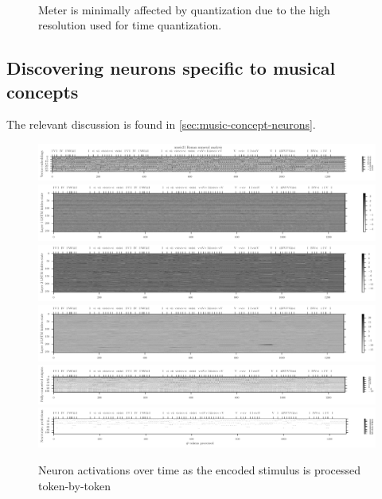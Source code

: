 \begin{figure}[htbp]
    \centering
    \begin{subfigure}[t]{0.48\textwidth}
        \centering
        
    \end{subfigure}
    ~
    \begin{subfigure}[t]{0.48\textwidth}
        \centering
        
    \end{subfigure}
    \caption{Meter is minimally affected by quantization due to the high resolution used for
    time quantization.}
    \label{fig:meter-time-quantization}
\end{figure}

\subsection{Discovering neurons specific to musical concepts}

The relevant discussion is found in \vref{sec:music-concept-neurons}.

\begin{figure}[htbp]
    \centering
    \includegraphics[width=1.0\linewidth]{model-analysis-tokens-0.pdf}
    \includegraphics[width=1.0\linewidth]{model-analysis-tokens-1.pdf}
    \includegraphics[width=1.0\linewidth]{model-analysis-tokens-2.pdf}
    \includegraphics[width=1.0\linewidth]{model-analysis-tokens-3.pdf}
    \includegraphics[width=1.0\linewidth]{model-analysis-tokens-4.pdf}
    \includegraphics[width=1.0\linewidth]{model-analysis-tokens-5.pdf}
    \caption{Neuron activations over time as the encoded stimulus is processed token-by-token}
    \label{fig:model-analysis-tokens}
\end{figure}


